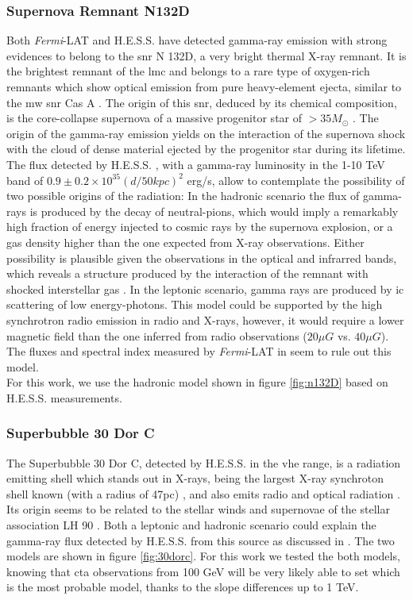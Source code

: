 \documentclass[main.tex]{subfiles}
\begin{document}
\subsubsection{Supernova Remnant N132D}

Both \textit{Fermi}-LAT and H.E.S.S. have detected gamma-ray emission with strong evidences to belong to the \gls{snr} N 132D, a very bright thermal X-ray remnant. It is the brightest remnant of the \gls{lmc} and belongs to a rare type of oxygen-rich remnants which show optical emission from pure heavy-element ejecta, similar to the \gls{mw} \gls{snr} Cas A \cite{2007N132D}. The origin of this \gls{snr}, deduced by its chemical composition, is the core-collapse supernova of a massive progenitor star of $> 35 M_{\odot}$ \cite{2007N132D}. The origin of the gamma-ray emission yields on the interaction of the supernova shock with the cloud of dense material ejected by the progenitor star during its lifetime. The flux detected by H.E.S.S. \cite{2015HESSTeVLMC}, with a gamma-ray luminosity in the 1-10 TeV band of $0.9 \pm 0.2 \times 10^{35}(d/50kpc)^2$ erg/s, allow to contemplate the possibility of two possible origins of the radiation: In the hadronic scenario the flux of gamma-rays is produced by the decay of neutral-pions, which would imply a remarkably high fraction of energy injected to cosmic rays by the supernova explosion, or a gas density higher than the one expected from X-ray observations. Either possibility is plausible given the observations in the optical and infrarred bands, which reveals a structure produced by the interaction of the remnant with shocked interstellar gas \cite{2006shockn132D}. In the leptonic scenario, gamma rays are produced by \gls{ic} scattering of low energy-photons. This model could be supported by the high synchrotron radio emission in radio and X-rays, however, it would require a lower magnetic field than the one inferred from radio observations ($20 \mu G$ vs. $40\mu G$). The fluxes and spectral index measured by \textit{Fermi}-LAT in \cite{2016LMCFermiLAT} seem to rule out this model.\\
For this work, we use the hadronic model shown in figure \ref{fig:n132D} based on H.E.S.S. measurements.


\subsubsection{Superbubble 30 Dor C}

The Superbubble 30 Dor C, detected by H.E.S.S. in the \gls{vhe} range, is a radiation emitting shell which stands out in X-rays, being the largest X-ray synchroton shell known (with a radius of 47pc) \cite{200430dorcxrays}, and also emits radio and optical radiation \cite{1985SNRsintheLMC30dorc}. Its origin seems to be related to the stellar winds and supernovae of the stellar association LH 90 \cite{198430dorLH90}. Both a leptonic and hadronic scenario could explain the gamma-ray flux detected by H.E.S.S. from this source as discussed in \cite{2015HESSTeVLMC}. The two models are shown in figure \ref{fig:30dorc}. For this work we tested the both models, knowing that \gls{cta} observations from 100 GeV will be very likely able to set which is the most probable model, thanks to the slope differences up to 1 TeV.
\end{document}
